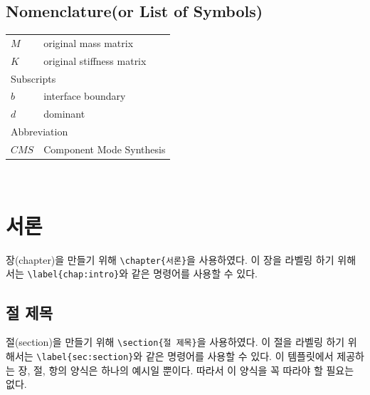 \documentclass[11pt]{report}
\numberwithin{figure}{section}
\theoremstyle{plain}
\theoremstyle{definition}
\theoremstyle{corollary}
\theoremstyle{definition}
\theoremstyle{plain}
\theoremstyle{definition}
\theoremstyle{plain}
\begin{document}

\newpage
\begin{center}
\section*{Nomenclature(or List of Symbols)}
\end{center}
\normalsize
\begin{tabular}{p{}p{}}
$M$	& original mass matrix\\
$K$	& original stiffness matrix\\[30pt]
\multicolumn{2}{l}{Subscripts}\\
$b$ & interface boundary\\
$d$ & dominant\\[30pt]
\multicolumn{2}{l}{Abbreviation}\\
$CMS$ & Component Mode Synthesis\\
\end{tabular}

\newpage 
\ %

\chapter{서론}\label{chap:intro}

장(chapter)을 만들기 위해 \verb|\chapter{서론}|을 사용하였다.
이 장을 라벨링 하기 위해서는 \verb|\label{chap:intro}|와 같은 명령어를 사용할 수 있다.

\section{절 제목}\label{sec:section}
절(section)을 만들기 위해 \verb|\section{절 제목}|을 사용하였다.
이 절을 라벨링 하기 위해서는 \verb|\label{sec:section}|와 같은 명령어를 사용할 수 있다.
이 템플릿에서 제공하는 장, 절, 항의 양식은 하나의 예시일 뿐이다.
따라서 이 양식을 꼭 따라야 할 필요는 없다.
\end{document}
